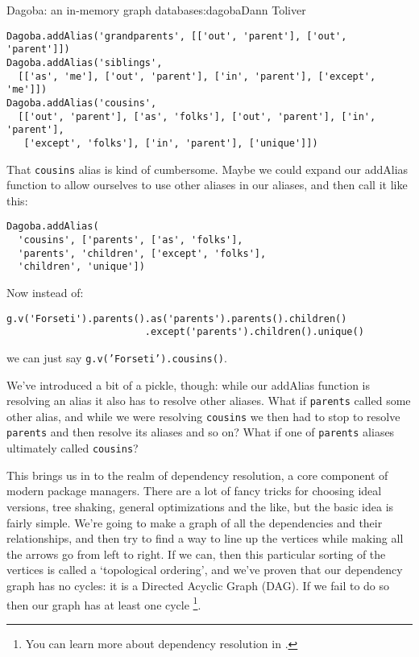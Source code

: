 \begin{aosachapter}{Dagoba: an in-memory graph database}{s:dagoba}{Dann Toliver}
\begin{verbatim}
Dagoba.addAlias('grandparents', [['out', 'parent'], ['out', 'parent']])
Dagoba.addAlias('siblings', 
  [['as', 'me'], ['out', 'parent'], ['in', 'parent'], ['except', 'me']])
Dagoba.addAlias('cousins', 
  [['out', 'parent'], ['as', 'folks'], ['out', 'parent'], ['in', 'parent'],
   ['except', 'folks'], ['in', 'parent'], ['unique']])
\end{verbatim}

That \texttt{cousins} alias is kind of cumbersome. Maybe we could expand
our addAlias function to allow ourselves to use other aliases in our
aliases, and then call it like this:

\begin{verbatim}
Dagoba.addAlias(
  'cousins', ['parents', ['as', 'folks'], 
  'parents', 'children', ['except', 'folks'], 
  'children', 'unique'])
\end{verbatim}

Now instead of:

\begin{verbatim}
g.v('Forseti').parents().as('parents').parents().children()
                        .except('parents').children().unique()
\end{verbatim}

we can just say \texttt{g.v('Forseti').cousins()}.

We've introduced a bit of a pickle, though: while our addAlias function
is resolving an alias it also has to resolve other aliases. What if
\texttt{parents} called some other alias, and while we were resolving
\texttt{cousins} we then had to stop to resolve \texttt{parents} and
then resolve its aliases and so on? What if one of \texttt{parents}
aliases ultimately called \texttt{cousins}?

This brings us in to the realm of dependency resolution, a core
component of modern package managers. There are a lot of fancy tricks
for choosing ideal versions, tree shaking, general optimizations and the
like, but the basic idea is fairly simple. We're going to make a graph
of all the dependencies and their relationships, and then try to find a
way to line up the vertices while making all the arrows go from left to
right. If we can, then this particular sorting of the vertices is called
a `topological ordering', and we've proven that our dependency graph has
no cycles: it is a Directed Acyclic Graph (DAG). If we fail to do so
then our graph has at least one cycle \footnote{You can learn more about
  dependency resolution in .}.


\end{aosachapter}
